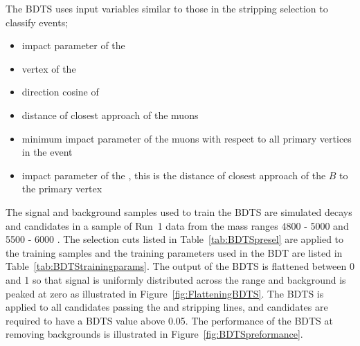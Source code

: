 The BDTS uses input variables similar to those in the stripping selection to classify events;
\begin{itemize}
\item impact parameter \chisqd of the \bs
\item vertex \chisqd of the \bs
\item direction cosine of \bs
\item distance of closest approach of the muons
\item minimum impact parameter \chisqd of the muons with respect to all primary vertices in the event
\item impact parameter of the \bs, this is the distance of closest approach of the $B$ to the primary vertex
\end{itemize}
The signal and background samples used to train the BDTS are simulated \bsmumu decays and \bsmumu candidates in a sample of Run~1 data from the mass ranges 4800 - 5000 \mevcc and 5500 - 6000 \mevcc. The selection cuts listed in Table~\ref{tab:BDTSpresel} are applied to the training samples and the training parameters used in the BDT are listed in Table~\ref{tab:BDTStrainingparams}. The output of the BDTS is flattened between 0 and 1 so that signal is uniformly distributed across the range and background is peaked at zero as illustrated in Figure~\ref{fig:FlatteningBDTS}. The BDTS is applied to all candidates passing the \bmumu and \bhh stripping lines, and candidates are required to have a BDTS value above 0.05. %
The performance of the BDTS at removing backgrounds is illustrated in Figure~\ref{fig:BDTSpreformance}. %

